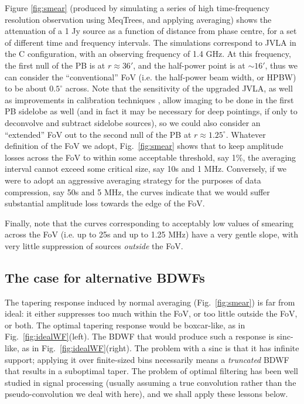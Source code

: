 \documentclass[useAMS,usenatbib]{mn2e}
\begin{document}
Figure \ref{fig:smear} (produced by simulating a series of high time-frequency resolution observation using MeqTrees\citep{noordam2010meqtrees}, and 
applying averaging) shows the attenuation of a 1 Jy source as a function of distance
from phase centre, for a set of different time and frequency intervals. The simulations correspond to JVLA 
in the C configuration, with an observing frequency of 1.4 GHz. At this frequency, the first null of the PB is at 
$r\approx36'$, and the half-power point is at $\sim16'$, thus we can consider the ``conventional'' FoV (i.e. the half-power 
beam width, or HPBW) to be about $0.5^\circ$ across. Note that the sensitivity of the upgraded JVLA, as well as
improvements in calibration techniques \citep{Perley-3C147}, allow imaging to be done in the first PB sidelobe as well
(and in fact it may be necessary for deep pointings, if only to deconvolve and subtract sidelobe sources), so we could also
consider an ``extended'' FoV out to the second null of the PB at $r\approx1.25^\circ$. Whatever definition
of the FoV we adopt, Fig.~\ref{fig:smear} shows that to keep amplitude losses across
the FoV to within some acceptable threshold, say 1\%, the averaging interval cannot exceed some critical size,
say 10s and 1 MHz. Conversely, if we were to adopt an aggressive averaging strategy for the purposes of data 
compression, say 50s and 5 MHz, the curves indicate that we would suffer substantial amplitude loss towards the 
edge of the FoV. 

Finally, note that the curves corresponding to acceptably low values of smearing across the FoV (i.e. up to 25s and 
up to 1.25 MHz) have a very gentle slope, with very little suppression of sources \emph{outside} the FoV. 

\subsection{The case for alternative BDWFs}

The tapering response induced by normal averaging (Fig.~\ref{fig:smear}) is far from ideal: it either suppresses too much within 
the FoV, or too little outside the FoV, or both. The optimal tapering response would be boxcar-like, as in 
Fig.~\ref{fig:idealWF}(left). The BDWF that would produce such a response is sinc-like, as in Fig.~\ref{fig:idealWF}(right). 
The problem with a sinc is that it has infinite support; applying it over finite-sized bins necessarily means a \emph{truncated} 
BDWF that results in a suboptimal taper. The problem of optimal filtering has been well studied in signal processing (usually
assuming a true convolution rather than the pseudo-convolution we deal with here), and we shall apply these lessons below.
\end{document}
